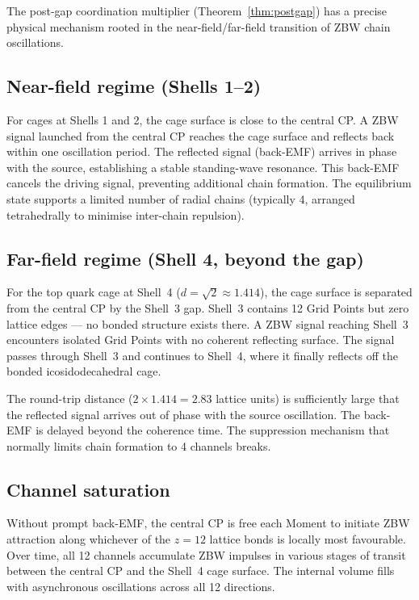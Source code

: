 \documentclass[11pt,letterpaper]{article}
\begin{document}
The post-gap coordination multiplier
(Theorem~\ref{thm:postgap}) has a precise physical mechanism
rooted in the near-field/far-field transition of ZBW chain
oscillations.

\subsection{Near-field regime (Shells 1--2)}

For cages at Shells 1 and 2, the cage surface is close to the
central CP.  A ZBW signal launched from the central CP reaches the
cage surface and reflects back within one oscillation period.  The
reflected signal (back-EMF) arrives in phase with the source,
establishing a stable standing-wave resonance.  This back-EMF
cancels the driving signal, preventing additional chain formation.
The equilibrium state supports a limited number of radial chains
(typically 4, arranged tetrahedrally to minimise inter-chain
repulsion).

\subsection{Far-field regime (Shell 4, beyond the gap)}

For the top quark cage at Shell~4 ($d = \sqrt{2} \approx 1.414$),
the cage surface is separated from the central CP by the Shell~3
gap.  Shell~3 contains 12 Grid Points but zero lattice edges ---
no bonded structure exists there.  A ZBW signal reaching Shell~3
encounters isolated Grid Points with no coherent reflecting surface.
The signal passes through Shell~3 and continues to Shell~4, where
it finally reflects off the bonded icosidodecahedral cage.

The round-trip distance ($2 \times 1.414 = 2.83$ lattice units) is
sufficiently large that the reflected signal arrives out of phase
with the source oscillation.  The back-EMF is delayed beyond the
coherence time.  The suppression mechanism that normally limits chain
formation to 4 channels breaks.

\subsection{Channel saturation}

Without prompt back-EMF, the central CP is free each Moment to
initiate ZBW attraction along whichever of the $z = 12$ lattice
bonds is locally most favourable.  Over time, all 12 channels
accumulate ZBW impulses in various stages of transit between the
central CP and the Shell~4 cage surface.  The internal volume fills
with asynchronous oscillations across all 12 directions.
\end{document}
